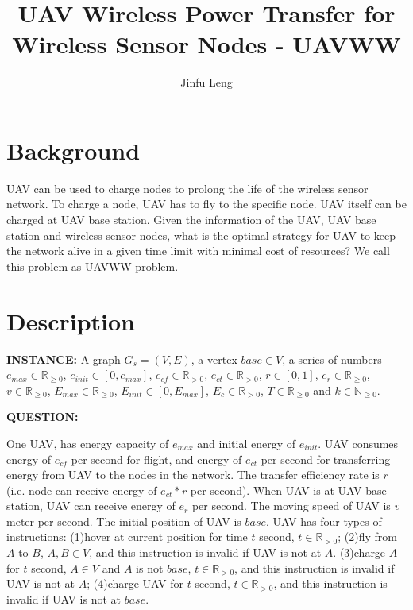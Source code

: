 \documentclass[11pt]{article}
\begin{document}
\title{UAV Wireless Power Transfer for Wireless Sensor Nodes - UAVWW}
\author{Jinfu Leng}
\maketitle
\section{Background}
UAV can be used to charge nodes to prolong the life of the wireless sensor network. To charge a node, UAV has to fly to the specific node. UAV itself can be charged at UAV base station. Given the information of the UAV, UAV base station and wireless sensor nodes, what is the optimal strategy for UAV to keep the network alive in a given time limit with minimal cost of resources? We call this problem as UAVWW problem.

\section{Description}
\noindent
\textbf{INSTANCE:} 
A graph $G_s = (V, E)$, a vertex $base \in V$, a series of numbers $e_{max} \in \mathbb{R}_{\geq0}$, $e_{init} \in [0, e_{max}]$, $e_{cf} \in \mathbb{R}_{>0}$, $e_{ct} \in \mathbb{R}_{>0}$, $r \in [0, 1]$, $e_r \in \mathbb{R}_{\geq0}$, $v \in \mathbb{R}_{\geq0}$, $E_{max} \in \mathbb{R}_{\geq0}$, $E_{init} \in [0, E_{max}]$, $E_{c} \in \mathbb{R}_{>0}$, $T \in \mathbb{R}_{\geq0}$ and $k \in \mathbb{N}_{\geq0}$.

\noindent
\textbf{QUESTION:}

One UAV, has energy capacity of $e_{max}$ and initial energy of $e_{init}$. UAV consumes energy of $e_{cf}$ per second for flight, and energy of $e_{ct}$ per second for transferring energy from UAV to the nodes in the network. The transfer efficiency rate is $r$ (i.e. node can receive energy of $e_{ct}*r$ per second). When UAV is at UAV base station, UAV can receive energy of $e_r$ per second. The moving speed of UAV is $v$ meter per second. The initial position of UAV is $base$. UAV has four types of instructions: (1)hover at current position for time $t$ second, $t \in \mathbb{R}_{>0}$; (2)fly from $A$ to $B$, $A,B \in V$, and this instruction is invalid if UAV is not at $A$. (3)charge $A$ for $t$ second, $A \in V$ and $A$ is not $base$, $t \in \mathbb{R}_{>0}$, and this instruction is invalid if UAV is not at $A$; (4)charge UAV for $t$ second, $t \in \mathbb{R}_{>0}$, and this instruction is invalid if UAV is not at $base$.
\end{document}
